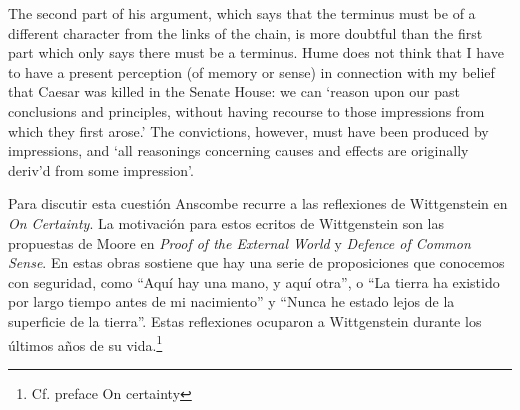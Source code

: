 The second part of his argument, which says that the terminus must be of a
different character from the links of the chain, is more doubtful than the first
part which only says there must be a terminus. Hume does not think that I have
to have a present perception (of memory or sense) in connection with my belief
that Caesar was killed in the Senate House: we can ‘reason upon our past
conclusions and principles, without having recourse to those impressions from
which they first arose.’ The convictions, however, must have been produced by
impressions, and ‘all reasonings concerning causes and effects are originally
deriv’d from some impression’.



Para discutir esta cuestión Anscombe recurre a las reflexiones de Wittgenstein
en \emph{On Certainty}. La motivación para estos ecritos de Wittgenstein son las
propuestas de Moore en \emph{Proof of the External World} y \emph{Defence of
  Common Sense}. En estas obras sostiene que hay una serie de proposiciones que
conocemos con seguridad, como \enquote{Aquí hay una mano, y aquí otra}, o
\enquote{La tierra ha existido por largo tiempo antes de mi nacimiento} y
\enquote{Nunca he estado lejos de la superficie de la tierra}. Estas reflexiones
ocuparon a Wittgenstein durante los últimos años de su vida.\footnote{Cf.
  preface On certainty}

